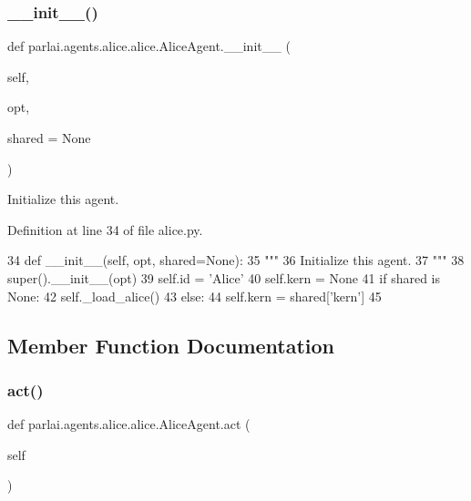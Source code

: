 \subsubsection{\texorpdfstring{\+\_\+\+\_\+init\+\_\+\+\_\+()}{\_\_init\_\_()}}
{\footnotesize\ttfamily def parlai.\+agents.\+alice.\+alice.\+Alice\+Agent.\+\_\+\+\_\+init\+\_\+\+\_\+ (\begin{DoxyParamCaption}\item[{}]{self,  }\item[{}]{opt,  }\item[{}]{shared = {\ttfamily None} }\end{DoxyParamCaption})}

\begin{DoxyVerb}Initialize this agent.
\end{DoxyVerb}
 

Definition at line 34 of file alice.\+py.


\begin{DoxyCode}
34     \textcolor{keyword}{def }\_\_init\_\_(self, opt, shared=None):
35         \textcolor{stringliteral}{"""}
36 \textcolor{stringliteral}{        Initialize this agent.}
37 \textcolor{stringliteral}{        """}
38         super().\_\_init\_\_(opt)
39         self.id = \textcolor{stringliteral}{'Alice'}
40         self.kern = \textcolor{keywordtype}{None}
41         \textcolor{keywordflow}{if} shared \textcolor{keywordflow}{is} \textcolor{keywordtype}{None}:
42             self.\_load\_alice()
43         \textcolor{keywordflow}{else}:
44             self.kern = shared[\textcolor{stringliteral}{'kern'}]
45 
\end{DoxyCode}


\subsection{Member Function Documentation}
\mbox{\label{classparlai_1_1agents_1_1alice_1_1alice_1_1AliceAgent_ab7156067d553d3f250513090c331eb4a}} 
\subsubsection{\texorpdfstring{act()}{act()}}
{\footnotesize\ttfamily def parlai.\+agents.\+alice.\+alice.\+Alice\+Agent.\+act (\begin{DoxyParamCaption}\item[{}]{self }\end{DoxyParamCaption})}

